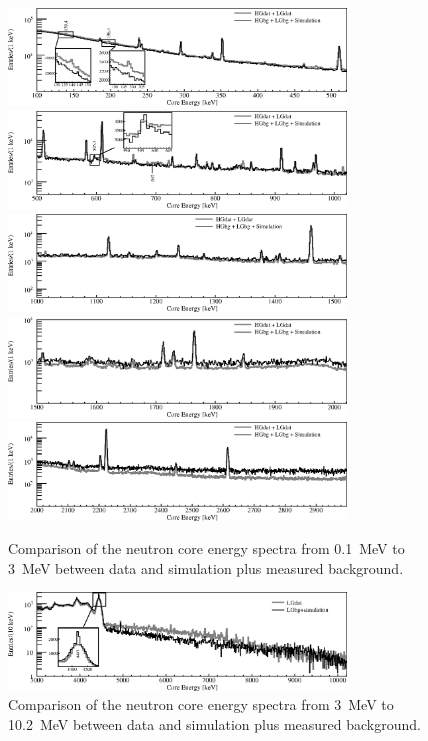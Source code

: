\begin{figure}[tbhp]
  \centering
  \includegraphics[width=0.8\textwidth,clip]{spectra_0_520keVm}
  \includegraphics[width=0.8\textwidth,clip]{spectra_500_1020keVm}
  \includegraphics[width=0.8\textwidth,clip]{spectra_1000_1520keVm}
  \includegraphics[width=0.8\textwidth,clip]{spectra_1500_2020keVm}
  \includegraphics[width=0.8\textwidth,clip]{spectra_2_3MeVm}
  \caption{Comparison of the neutron core energy spectra from 0.1~MeV
    to 3~MeV between data and simulation plus measured background.}
  \label{fig:neu:mc}
\end{figure}

\begin{figure}[tbhp]
  \centering
  \includegraphics[width=0.8\textwidth,clip]{spectra_3_11MeVm}
  \caption{Comparison of the neutron core energy spectra from 3~MeV to
    10.2~MeV between data and simulation plus measured background.}
  \label{fig:neu:mcl}
\end{figure}


